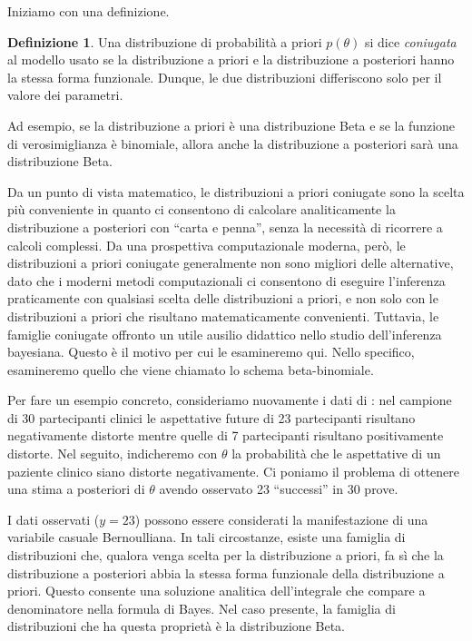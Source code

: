 \documentclass[
  11pt,
]{krantz}
\theoremstyle{definition}
\newtheorem{definition}{Definizione}[chapter]
\theoremstyle{definition}
\theoremstyle{definition}
\theoremstyle{definition}
\theoremstyle{remark}
\begin{document}
Iniziamo con una definizione.

\begin{definition}
Una distribuzione di probabilità a priori \(p(\theta)\) si dice \emph{coniugata} al modello usato se la distribuzione a priori e la distribuzione a posteriori hanno la stessa forma funzionale. Dunque, le due distribuzioni differiscono solo per il valore dei parametri.
\end{definition}

Ad esempio, se la distribuzione a priori è una distribuzione Beta e se la funzione di verosimiglianza è binomiale, allora anche la distribuzione a posteriori sarà una distribuzione Beta.

Da un punto di vista matematico, le distribuzioni a priori coniugate sono la scelta più conveniente in quanto ci consentono di calcolare analiticamente la distribuzione a posteriori con ``carta e penna'', senza la necessità di ricorrere a calcoli complessi. Da una prospettiva computazionale moderna, però, le distribuzioni a priori coniugate generalmente non sono migliori delle alternative, dato che i moderni metodi computazionali ci consentono di eseguire l'inferenza praticamente con qualsiasi scelta delle distribuzioni a priori, e non solo con le distribuzioni a priori che risultano matematicamente convenienti. Tuttavia, le famiglie coniugate offronto un utile ausilio didattico nello studio dell'inferenza bayesiana. Questo è il motivo per cui le esamineremo qui. Nello specifico, esamineremo quello che viene chiamato lo schema beta-binomiale.

Per fare un esempio concreto, consideriamo nuovamente i dati di \citet{zetschefuture2019}: nel campione di 30 partecipanti clinici le aspettative future di 23 partecipanti risultano negativamente distorte mentre quelle di 7 partecipanti risultano positivamente distorte. Nel seguito, indicheremo con \(\theta\) la probabilità che le aspettative di un paziente clinico siano distorte negativamente. Ci poniamo il problema di ottenere una stima a posteriori di \(\theta\) avendo osservato 23 ``successi'' in 30 prove.

I dati osservati (\(y = 23\)) possono essere considerati la manifestazione di una variabile casuale Bernoulliana. In tali circostanze, esiste una famiglia di distribuzioni che, qualora venga scelta per la distribuzione a priori, fa sì che la distribuzione a posteriori abbia la stessa forma funzionale della distribuzione a priori. Questo consente una soluzione analitica dell'integrale che compare a denominatore nella formula di Bayes. Nel caso presente, la famiglia di distribuzioni che ha questa proprietà è la distribuzione Beta.
\end{document}
